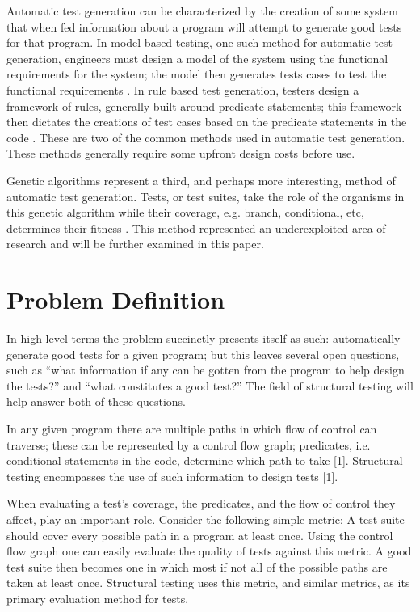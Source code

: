 \documentclass[runningheads]{llncs}
\begin{document}
Automatic test generation can be characterized by the creation of some system that when fed information about a program will attempt to generate good tests for that program. In model based testing, one such method for automatic test generation, engineers must design a model of the system using the functional requirements for the system; the model then generates tests cases to test the functional requirements \cite{model2}. In rule based test generation, testers design a framework of rules, generally built around predicate statements; this framework then dictates the creations of test cases based on the predicate statements in the code \cite{chang3}. These are two of the common methods used in automatic test generation. These methods generally require some upfront design costs before use. 

Genetic algorithms represent a third, and perhaps more interesting, method of automatic test generation. Tests, or test suites, take the role of the organisms in this genetic algorithm while their coverage, e.g. branch, conditional, etc, determines their fitness \cite{sthammer4}. This method represented an underexploited area of research and will be further examined in this paper. 

\newpage
\section{Problem Definition}
In high-level terms the problem succinctly presents itself as such: automatically generate good tests for a given program; but this leaves several open questions, such as ``what information if any can be gotten from the program to help design the tests?'' and ``what constitutes a good test?'' The field of structural testing will help answer both of these questions.

In any given program there are multiple paths in which flow of control can traverse; these can be represented by a control flow graph; predicates, i.e. conditional statements in the code, determine which path to take [1]. Structural testing encompasses the use of such information to design tests [1].

When evaluating a test's coverage, the predicates, and the flow of control they affect, play an important role. Consider the following simple metric: A test suite should cover every possible path in a program at least once. Using the control flow graph one can easily evaluate the quality of tests against this metric. A good test suite then becomes one in which most if not all of the possible paths are taken at least once. Structural testing uses this metric, and similar metrics, as its primary evaluation method for tests.
\end{document}
